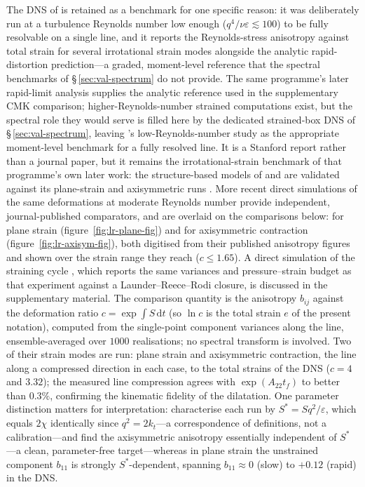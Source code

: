 \documentclass[11pt,a4paper]{article}
\begin{document}
The DNS of \citet{LeeReynolds1985} is retained as a benchmark for one
specific reason: it was deliberately run at a turbulence Reynolds number
low enough ($q^4/\nu\varepsilon\lesssim100$) to be fully resolvable on a
single line, and it reports the Reynolds-stress anisotropy against total
strain for several irrotational strain modes alongside the analytic
rapid-distortion prediction---a graded, moment-level reference that the
spectral benchmarks of \S\,\ref{sec:val-spectrum} do not provide. The
same programme's later rapid-limit analysis
\citep{LeePiomelliReynolds1986} supplies the analytic reference used in
the supplementary CMK comparison; higher-Reynolds-number strained
computations exist, but the spectral role they would serve is filled
here by the dedicated strained-box DNS of \S\,\ref{sec:val-spectrum},
leaving \citeauthor{LeeReynolds1985}'s low-Reynolds-number study as the
appropriate moment-level benchmark for a fully resolved line. It is a
Stanford report rather than a journal paper, but it remains the
irrotational-strain benchmark of that programme's own later work: the
structure-based models of \citet{ReynoldsKassinos1995} and
\citet{KassinosReynoldsRogers2001} are validated against its plane-strain
and axisymmetric runs \citep{KassinosReynolds1998}. More recent direct
simulations of the same deformations at moderate Reynolds number provide
independent, journal-published comparators, and are overlaid on the
comparisons below: \citet{ZusiPerot2013} for plane strain
(figure~\ref{fig:lr-plane-fig}) and \citet{ZusiPerot2014} for
axisymmetric contraction (figure~\ref{fig:lr-axisym-fig}), both digitised
from their published anisotropy figures and shown over the strain range
they reach ($c\le1.65$). A direct simulation of the
\citeauthor{ChenMeneveauKatz2006} straining cycle
\citep{GualtieriMeneveau2010}, which reports the same variances and
pressure--strain budget as that experiment against a
Launder--Reece--Rodi closure, is discussed in the supplementary material.
The
comparison quantity is the anisotropy $b_{ij}$ against the deformation
ratio $c=\exp\int S\,\mathrm{d}t$ (so $\ln c$ is the total strain $e$ of
the present notation), computed from the single-point component
variances along the line, ensemble-averaged over $1000$ realisations;
no spectral transform is involved. Two of their strain modes are run:
plane strain and axisymmetric contraction, the line along a compressed
direction in each case, to the total strains of the DNS ($c=4$ and
$3.32$); the measured line compression agrees with
$\exp(A_{22}t_f)$ to better than $0.3\%$, confirming the kinematic
fidelity of the dilatation. One parameter distinction matters for
interpretation: \citeauthor{LeeReynolds1985} characterise each run by
$S^{*}=Sq^2/\varepsilon$, which equals $2\chi$ identically since
$q^2=2k_t$---a correspondence of definitions, not a calibration---and
find the axisymmetric anisotropy
essentially independent of $S^{*}$---a clean, parameter-free
target---whereas in plane strain the unstrained component $b_{11}$ is
strongly $S^{*}$-dependent, spanning $b_{11}\approx0$ (slow) to
$+0.12$ (rapid) in the DNS.
\end{document}
